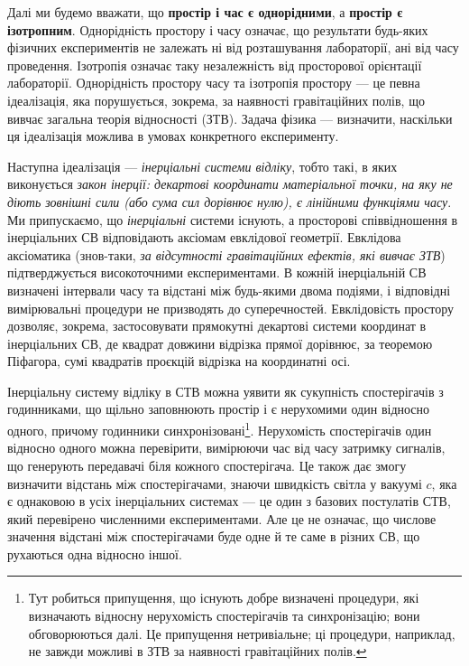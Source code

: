 Далі ми будемо вважати, що \textbf{простір і час є однорідними}, а \textbf{простір є ізотропним}. Однорідність простору
і часу означає, що результати будь-яких фізичних експериментів не залежать ні від розташування лабораторії, ані від часу
проведення. Ізотропія означає таку незалежність від просторової орієнтації лабораторії. Однорідність простору часу та
ізотропія простору --- це певна ідеалізація, яка порушується, зокрема, за наявності гравітаційних полів, що вивчає
загальна теорія відносності (ЗТВ). Задача фізика --- визначити, наскільки ця ідеалізація можлива в умовах конкретного
експерименту.

Наступна ідеалізація --- \emph{інерціальні системи відліку}, тобто такі, в яких виконується \emph{закон інерції:
декартові координати матеріальної точки, на яку не діють зовнішні сили (або сума сил дорівнює нулю), є лінійними
функціями часу}. Ми припускаємо, що \emph{інерціальні }системи існують, а просторові співвідношення в інерціальних СВ
відповідають аксіомам евклідової геометрії. Евклідова аксіоматика (знов-таки, \emph{за відсутності гравітаційних
ефектів, які вивчає ЗТВ}) підтверджується високоточними експериментами. В кожній інерціальній СВ визначені інтервали
часу та відстані між будь-якими двома подіями, і відповідні вимірювальні процедури не призводять до суперечностей.
Евклідовість простору дозволяє, зокрема, застосовувати прямокутні декартові системи координат в інерціальних СВ, де
квадрат довжини відрізка прямої дорівнює, за теоремою Піфагора, сумі квадратів проєкцій відрізка на координатні осі.

Інерціальну систему відліку в СТВ можна уявити як сукупність спостерігачів з годинниками, що щільно заповнюють простір і
є нерухомими один відносно одного, причому годинники синхронізовані\footnote{Тут робиться припущення, що існують добре
визначені процедури, які визначають відносну нерухомість спостерігачів та синхронізацію; вони обговорюються далі. Це
припущення нетривіальне; ці процедури, наприклад, не завжди можливі в ЗТВ за наявності гравітаційних полів.}.
Нерухомість спостерігачів один відносно одного можна перевірити, вимірюючи час від часу затримку сигналів, що генерують
передавачі біля кожного спостерігача. Це також дає змогу визначити відстань між спостерігачами, знаючи швидкість світла
у вакуумі $c$, яка є однаковою в усіх інерціальних системах --- це один з базових постулатів СТВ, який перевірено
численними експериментами. Але це не означає, що числове значення відстані між спостерігачами буде одне й те саме в
різних СВ, що рухаються одна відносно іншої.


